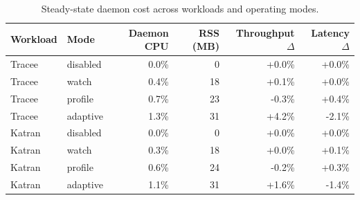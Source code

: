 \begin{table}[t]
  \centering
  \caption{Steady-state daemon cost across workloads and operating modes. }
  \label{tab:rq3-daemon-overhead}
  \small
  \begin{tabular}{llrrrr}
    \toprule
    Workload & Mode & Daemon CPU & RSS (MB) & Throughput $\Delta$ & Latency $\Delta$ \\
    \midrule
    Tracee & disabled & 0.0\% & 0 & +0.0\% & +0.0\% \\
    Tracee & watch & 0.4\% & 18 & +0.1\% & +0.0\% \\
    Tracee & profile & 0.7\% & 23 & -0.3\% & +0.4\% \\
    Tracee & adaptive & 1.3\% & 31 & +4.2\% & -2.1\% \\
    Katran & disabled & 0.0\% & 0 & +0.0\% & +0.0\% \\
    Katran & watch & 0.3\% & 18 & +0.0\% & +0.1\% \\
    Katran & profile & 0.6\% & 24 & -0.2\% & +0.3\% \\
    Katran & adaptive & 1.1\% & 31 & +1.6\% & -1.4\% \\
    \bottomrule
  \end{tabular}
\end{table}
